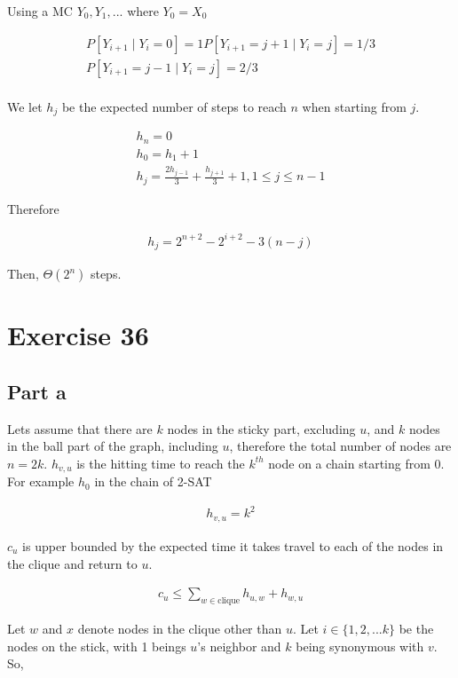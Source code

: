 \documentclass[12pt, a4paper]{article}
\begin{document}
Using a MC $Y_0,Y_1, ...$ where $Y_0 = X_0$

\begin{align*}
  P[Y_{i+1} \mid Y_i = 0] = 1
  P[Y_{i+1} = j + 1 \mid Y_i = j] = 1/3\\
  P[Y_{i+1} = j - 1 \mid Y_i = j] = 2/3\\
\end{align*}


We let $h_j$ be the expected number of steps to reach $n$ when starting from $j$.

\begin{align*}
  h_n = 0\\
  h_0 = h_1 + 1\\
  h_j = \frac{2h_{j-1}}{3} + \frac{h_{j+1}}{3} + 1, 1 \leq j \leq n - 1
\end{align*}

Therefore

\begin{align*}
  h_j = 2^{n+2} - 2^{i+2} - 3(n - j)
\end{align*}

Then, $\Theta(2^n)$ steps.

\section{Exercise 36}
\subsection{Part a}

Lets assume that there are $k$ nodes in the sticky part, excluding $u$, and $k$
nodes in the ball part of the graph, including $u$, therefore the total number
of nodes are $n = 2k$. $h_{v,u}$ is the hitting time to reach the $k^{th}$ node
on a chain starting from $0$. For example $h_0$ in the chain of 2-SAT

\begin{align*}
  h_{v,u} = k^2
\end{align*}

$c_u$ is upper bounded by the expected time it takes travel to each of the
nodes in the clique and return to $u$.

\begin{align*}
  c_u \leq \sum_{w \in \text{clique}} h_{u,w} + h_{w,u} 
\end{align*}

Let $w$ and $x$ denote nodes in the clique other than $u$.
Let $i \in \{1,2,...k\}$ be the nodes on the stick, with 1 beings $u$'s neighbor
and $k$ being synonymous with $v$. So,
\end{document}

